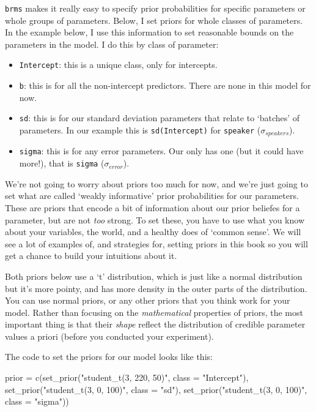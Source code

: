 \documentclass[
]{book}
\newenvironment{Shaded}{\begin{snugshade}}{\end{snugshade}}
\newcommand{\AttributeTok}[1]{\textcolor[rgb]{0.77,0.63,0.00}{#1}}
\newcommand{\FunctionTok}[1]{\textcolor[rgb]{0.00,0.00,0.00}{#1}}
\newcommand{\NormalTok}[1]{#1}
\newcommand{\OtherTok}[1]{\textcolor[rgb]{0.56,0.35,0.01}{#1}}
\newcommand{\StringTok}[1]{\textcolor[rgb]{0.31,0.60,0.02}{#1}}
\providecommand{\tightlist}{%
  \setlength{\itemsep}{0pt}\setlength{\parskip}{0pt}}
\begin{document}
\texttt{brms} makes it really easy to specify prior probabilities for specific parameters or whole groups of parameters. Below, I set priors for whole classes of parameters. In the example below, I use this information to set reasonable bounds on the parameters in the model. I do this by class of parameter:

\begin{itemize}
\tightlist
\item
  \texttt{Intercept}: this is a unique class, only for intercepts.
\item
  \texttt{b}: this is for all the non-intercept predictors. There are none in this model for now.
\item
  \texttt{sd}: this is for our standard deviation parameters that relate to `batches' of parameters. In our example this is \texttt{sd(Intercept)} for \texttt{speaker} (\(\sigma_{speakers}\)).
\item
  \texttt{sigma}: this is for any error parameters. Our only has one (but it could have more!), that is \texttt{sigma} (\(\sigma_{error}\)).
\end{itemize}

We're not going to worry about priors too much for now, and we're just going to set what are called `weakly informative' prior probabilities for our parameters. These are priors that encode a bit of information about our prior beliefes for a parameter, but are not \emph{too} strong. To set these, you have to use what you know about your variables, the world, and a healthy does of `common sense'. We will see a lot of examples of, and strategies for, setting priors in this book so you will get a chance to build your intuitions about it.

Both priors below use a `t' distribution, which is just like a normal distribution but it's more pointy, and has more density in the outer parts of the distribution. You can use normal priors, or any other priors that you think work for your model. Rather than focusing on the \emph{mathematical} properties of priors, the most important thing is that their \emph{shape} reflect the distribution of credible parameter values a priori (before you conducted your experiment).

The code to set the priors for our model looks like this:

\begin{Shaded}
\begin{Highlighting}[]
\NormalTok{  prior }\OtherTok{=} \FunctionTok{c}\NormalTok{(}\FunctionTok{set\_prior}\NormalTok{(}\StringTok{"student\_t(3, 220, 50)"}\NormalTok{, }\AttributeTok{class =} \StringTok{"Intercept"}\NormalTok{),}
            \FunctionTok{set\_prior}\NormalTok{(}\StringTok{"student\_t(3, 0, 100)"}\NormalTok{, }\AttributeTok{class =} \StringTok{"sd"}\NormalTok{),}
            \FunctionTok{set\_prior}\NormalTok{(}\StringTok{"student\_t(3, 0, 100)"}\NormalTok{, }\AttributeTok{class =} \StringTok{"sigma"}\NormalTok{))}
\end{Highlighting}
\end{Shaded}
\end{document}
